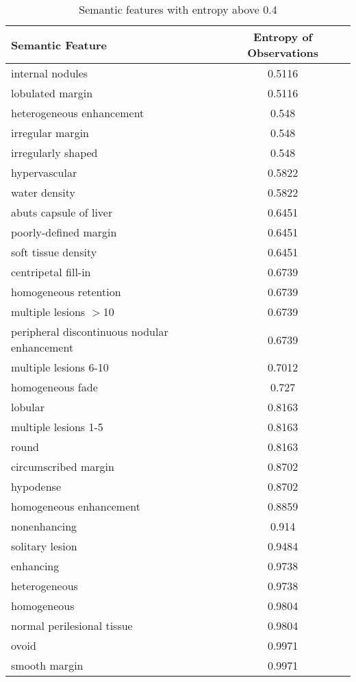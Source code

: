 \begin{table}[h!]
	\centering
	\begin{tabular}{|l|c|}
		\hline
		Semantic Feature & Entropy of Observations \\ \hline \hline
		internal nodules & 0.5116 \\ \hline
		lobulated margin & 0.5116 \\ \hline
		heterogeneous enhancement & 0.548 \\ \hline
		irregular margin & 0.548 \\ \hline
		irregularly shaped & 0.548 \\ \hline
		hypervascular & 0.5822 \\ \hline
		water density & 0.5822 \\ \hline
		abuts capsule of liver & 0.6451 \\ \hline
		poorly-defined margin & 0.6451 \\ \hline
		soft tissue density & 0.6451 \\ \hline
		centripetal fill-in & 0.6739 \\ \hline
		homogeneous retention & 0.6739 \\ \hline
		multiple lesions $>$10 & 0.6739 \\ \hline
		peripheral discontinuous nodular enhancement & 0.6739 \\ \hline
		multiple lesions 6-10 & 0.7012 \\ \hline
		homogeneous fade & 0.727 \\ \hline
		lobular & 0.8163 \\ \hline
		multiple lesions 1-5 & 0.8163 \\ \hline
		round & 0.8163 \\ \hline
		circumscribed margin & 0.8702 \\ \hline
		hypodense & 0.8702 \\ \hline
		homogeneous enhancement & 0.8859 \\ \hline
		nonenhancing & 0.914 \\ \hline
		solitary lesion & 0.9484 \\ \hline
		enhancing & 0.9738 \\ \hline
		heterogeneous & 0.9738 \\ \hline
		homogeneous & 0.9804 \\ \hline
		normal perilesional tissue & 0.9804 \\ \hline
		ovoid & 0.9971 \\ \hline
		smooth margin & 0.9971 \\ \hline
	\end{tabular}
	\caption{Semantic features with entropy above 0.4}
	\label{table:semanticfeaturelist}
\end{table}

